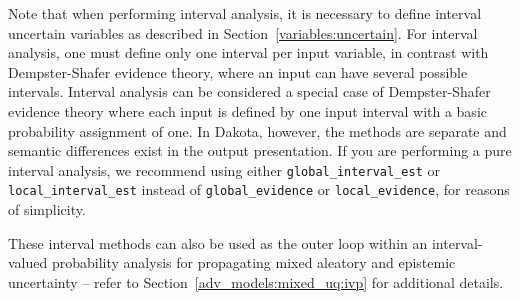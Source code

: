 Note that when performing interval analysis, it is necessary to define
interval uncertain variables as described in
Section~\ref{variables:uncertain}. For interval analysis, one must
define only one interval per input variable, in contrast with
Dempster-Shafer evidence theory, where an input can have several
possible intervals. Interval analysis can be considered a special
case of Dempster-Shafer evidence theory where each input is defined by
one input interval with a basic probability assignment of one. In
Dakota, however, the methods are separate and semantic differences
exist in the output presentation. If you are performing a pure
interval analysis, we recommend using either
\texttt{global\_interval\_est} or \texttt{local\_interval\_est}
instead of \texttt{global\_evidence} or \texttt{local\_evidence}, for
reasons of simplicity. %

These interval methods can also be used as the outer loop within an
interval-valued probability analysis for propagating mixed aleatory
and epistemic uncertainty -- refer to
Section~\ref{adv_models:mixed_uq:ivp} for additional details.



 
